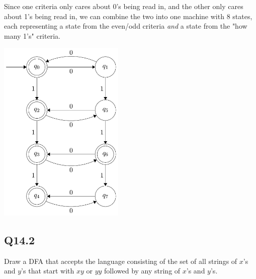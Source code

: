 \documentclass{article}
\begin{document}
Since one criteria only cares about 0's being read in, and the other only cares about 1's being read in, we can combine the two into one machine with 8 states, each representing a state from the even/odd criteria \textit{and} a state from the "how many 1's" criteria.
\begin{center}
    \includegraphics[width=6cm]{Screenshot 2023-11-21 143618.png}
\end{center}
\newpage

\subsection*{Q14.2}
Draw a DFA that accepts the language consisting of the set of all strings of \( x \)'s and \( y \)'s that start with \( xy \) or \( yy \) followed by any string of \( x \)'s and \( y \)'s.
\newpage
\end{document}
